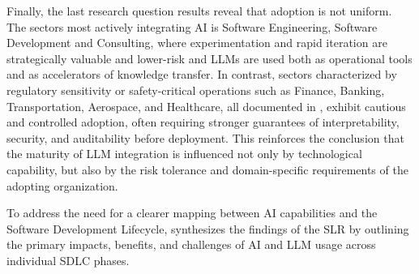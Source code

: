 Finally, the last research question results reveal that adoption is not uniform. The sectors most actively integrating AI is Software Engineering, Software Development and Consulting, where experimentation and rapid iteration are strategically valuable and lower-risk and LLMs are used both as operational tools and as accelerators of knowledge transfer. In contrast, sectors characterized by regulatory sensitivity or safety-critical operations such as Finance, Banking, Transportation, Aerospace, and Healthcare, all documented in , exhibit cautious and controlled adoption, often requiring stronger guarantees of interpretability, security, and auditability before deployment. This reinforces the conclusion that the maturity of LLM integration is influenced not only by technological capability, but also by the risk tolerance and domain-specific requirements of the adopting organization.

To address the need for a clearer mapping between AI capabilities and the Software Development Lifecycle,  synthesizes the findings of the SLR by outlining the primary impacts, benefits, and challenges of AI and LLM usage across individual SDLC phases.

